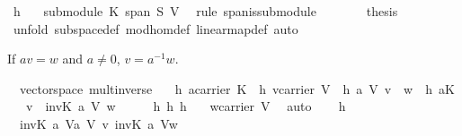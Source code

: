 \begin{isabellebody}
\ h{}\ \isamarkupfalse%
\ {}{\isacharcolon}\ {\isachardoublequoteopen}submodule\ K\ {\isacharparenleft}span\ S{\isacharparenright}\ V{\isachardoublequoteclose}\ \isamarkupfalse%
\ {\isacharparenleft}rule\ span{\isacharunderscore}is{\isacharunderscore}submodule{\isacharparenright}\isanewline
\ \ \isamarkupfalse%
\ {}\ {}\ \isamarkupfalse%
\ {\isacharquery}thesis\ \isamarkupfalse%
\ {\isacharparenleft}unfold\ subspace{\isacharunderscore}def\ mod{\isacharunderscore}hom{\isacharunderscore}def\ linear{\isacharunderscore}map{\isacharunderscore}def{\isacharcomma}\ auto{\isacharparenright}\isanewline
{}\isamarkupfalse%
%
\endisatagproof
{\isafoldproof}%
%
\isadelimproof
%
\endisadelimproof
%
\isamarkuptrue%
%
\begin{isamarkuptext}%
If $av = w$ and $a\neq 0$, $v=a^{-1}w$.%
\end{isamarkuptext}%
\isamarkuptrue%
\isamarkupfalse%
\ {\isacharparenleft}\ vectorspace{\isacharparenright}\ mult{\isacharunderscore}inverse{\isacharcolon}\isanewline
\ \ \ h{}{\isacharcolon}\ {\isachardoublequoteopen}a{\isasymin}carrier\ K{\isachardoublequoteclose}\ \ h{}{\isacharcolon}\ {\isachardoublequoteopen}v{\isasymin}carrier\ V{\isachardoublequoteclose}\ \ h{}{\isacharcolon}\ {\isachardoublequoteopen}a\ {\isasymodot}\isactrlbsub V\isactrlesub \ v\ {\isacharequal}\ w{\isachardoublequoteclose}\ \ h{}{\isacharcolon}\ {\isachardoublequoteopen}a{\isasymnoteq}{\isasymzero}\isactrlbsub K\isactrlesub {\isachardoublequoteclose}\isanewline
\ \ \ {\isachardoublequoteopen}v\ {\isacharequal}\ {\isacharparenleft}inv\isactrlbsub K\isactrlesub \ a\ {\isacharparenright}{\isasymodot}\isactrlbsub V\isactrlesub \ w{\isachardoublequoteclose}\isanewline
%
\isadelimproof
%
\endisadelimproof
%
\isatagproof
{}\isamarkupfalse%
\ {\isacharminus}\isanewline
\ \ \isamarkupfalse%
\ h{}\ h{}\ h{}\ \isamarkupfalse%
\ {}{\isacharcolon}\ {\isachardoublequoteopen}w{\isasymin}carrier\ V{\isachardoublequoteclose}\ \isamarkupfalse%
\ auto\isanewline
\ \ \isamarkupfalse%
\ h{}\ {}\ \isamarkupfalse%
\ {}{\isacharcolon}\ {\isachardoublequoteopen}{\isacharparenleft}inv\isactrlbsub K\isactrlesub \ a\ {\isacharparenright}{\isasymodot}\isactrlbsub V\isactrlesub {\isacharparenleft}a\ {\isasymodot}\isactrlbsub V\isactrlesub \ v{\isacharparenright}\ {\isacharequal}{\isacharparenleft}inv\isactrlbsub K\isactrlesub \ a\ {\isacharparenright}{\isasymodot}\isactrlbsub V\isactrlesub w{\isachardoublequoteclose}\ \isamarkupfalse%

\end{isabellebody}
